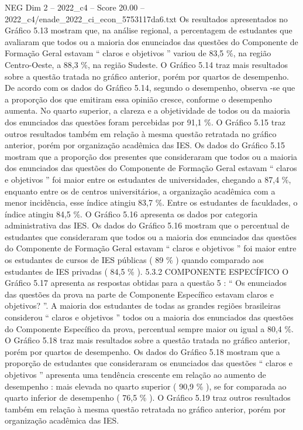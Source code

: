 \begin{textsample}{NEG Dim 2 – 2022\_c4 – Score 20.00 – 2022\_c4/enade\_2022\_ci\_econ\_5753117da6.txt}
Os resultados apresentados no Gráfico 5.13 mostram que, na análise regional, a percentagem de estudantes que avaliaram que todos ou a maioria dos enunciados das questões do Componente de Formação Geral estavam “ claros e objetivos ” variou de 83,5 \%, na região Centro-Oeste, a 88,3 \%, na região Sudeste.
O Gráfico 5.14 traz mais resultados sobre a questão tratada no gráfico anterior, porém por quartos de desempenho.
De acordo com os dados do Gráfico 5.14, segundo o desempenho, observa -se que a proporção dos que emitiram essa opinião cresce, conforme o desempenho aumenta.
No quarto superior, a clareza e a objetividade de todos ou da maioria dos enunciados das questões foram percebidas por 91,1 \%.
O Gráfico 5.15 traz outros resultados também em relação à mesma questão retratada no gráfico anterior, porém por organização acadêmica das IES.
Os dados do Gráfico 5.15 mostram que a proporção dos presentes que consideraram que todos ou a maioria dos enunciados das questões do Componente de Formação Geral estavam “ claros e objetivos ” foi maior entre os estudantes de universidades, chegando a 87,4 \%, enquanto entre os de centros universitários, a organização acadêmica com a menor incidência, esse índice atingiu 83,7 \%.
Entre os estudantes de faculdades, o índice atingiu 84,5 \%.
O Gráfico 5.16 apresenta os dados por categoria administrativa das IES.
Os dados do Gráfico 5.16 mostram que o percentual de estudantes que consideraram que todos ou a maioria dos enunciados das questões do Componente de Formação Geral estavam “ claros e objetivos ” foi maior entre os estudantes de cursos de IES públicas ( 89 \% ) quando comparado aos estudantes de IES privadas ( 84,5 \% ). 5.3.2 COMPONENTE ESPECÍFICO O Gráfico 5.17 apresenta as respostas obtidas para a questão 5 : “ Os enunciados das questões da prova na parte de Componente Específico estavam claros e objetivos? ”.
A maioria dos estudantes de todas as grandes regiões brasileiras considerou “ claros e objetivos ” todos ou a maioria dos enunciados das questões do Componente Específico da prova, percentual sempre maior ou igual a 80,4 \%.
O Gráfico 5.18 traz mais resultados sobre a questão tratada no gráfico anterior, porém por quartos de desempenho.
Os dados do Gráfico 5.18 mostram que a proporção de estudantes que consideraram os enunciados das questões “ claros e objetivos ” apresenta uma tendência crescente em relação ao aumento de desempenho : mais elevada no quarto superior ( 90,9 \% ), se for comparada ao quarto inferior de desempenho ( 76,5 \% ).
O Gráfico 5.19 traz outros resultados também em relação à mesma questão retratada no gráfico anterior, porém por organização acadêmica das IES.

\end{textsample}
